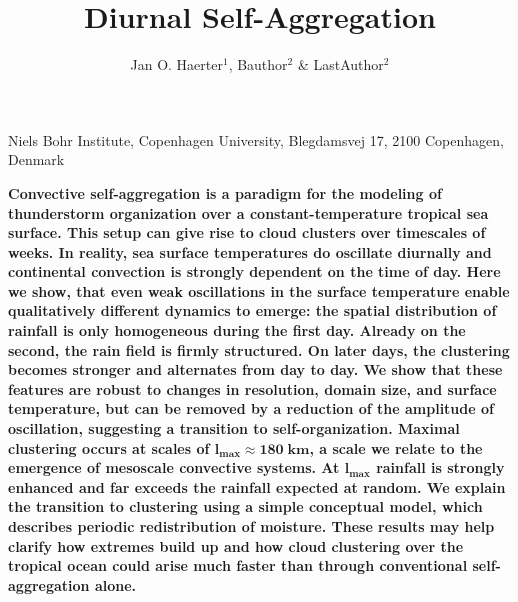 \documentclass{article}
\title{Diurnal Self-Aggregation}
\author{Jan O. Haerter$^{1}$, Bauthor$^2$ \& LastAuthor$^2$}
\begin{document}
\maketitle

\begin{affiliations}
 \item Niels Bohr Institute, Copenhagen University, Blegdamsvej 17, 2100 Copenhagen, Denmark
\end{affiliations}

{\bf
Convective self-aggregation is a paradigm for the modeling of thunderstorm organization over a constant-temperature tropical sea surface. 
This setup can give rise to cloud clusters over timescales of weeks. 
In reality, sea surface temperatures do oscillate diurnally and continental convection is strongly dependent on the time of day.
Here we show, that even weak oscillations in the surface temperature enable qualitatively different dynamics to emerge:
the spatial distribution of rainfall is only homogeneous during the first day. 
Already on the second, the rain field is firmly structured.
On later days, the clustering becomes stronger and alternates from day to day.
We show that these features are robust to changes in resolution, domain size, and surface temperature, but can be removed by a reduction of the amplitude of oscillation, suggesting a transition to self-organization. 
Maximal clustering occurs at scales of $\mathbf{l_{max}\approx 180\;km}$, a scale we relate to the emergence of mesoscale convective systems. 
At $\mathbf{l_{max}}$ rainfall is strongly enhanced and far exceeds the rainfall expected at random. 
We explain the transition to clustering using a simple conceptual model, which describes periodic redistribution of moisture. 
These results may help clarify how extremes build up and how cloud clustering over the tropical ocean could arise much faster than through conventional self-aggregation alone.
}



\end{document}
